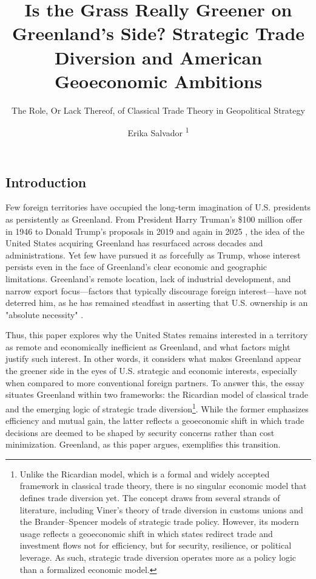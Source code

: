 \documentclass{adonis}
\title{Is the Grass Really Greener on Greenland’s Side? Strategic Trade Diversion and American Geoeconomic Ambitions}
\subtitle{The Role, Or Lack Thereof, of Classical Trade Theory in Geopolitical Strategy}
\author{Erika Salvador \textsuperscript{1}}
\affiliation{\textsuperscript{1} Department of Economics, Amherst College}
\begin{document}
	\maketitle

    \subsection*{Introduction}

    Few foreign territories have occupied the long-term imagination of U.S. presidents as persistently as Greenland. From President Harry Truman’s \$100 million offer in 1946 \citep{ewing2019greenland} to Donald Trump’s proposals in 2019 and again in 2025 \citep{mcdonald2019greenland, paddison2025greenland}, the idea of the United States acquiring Greenland has resurfaced across decades and administrations. Yet few have pursued it as forcefully as Trump, whose interest persists even in the face of Greenland’s clear economic and geographic limitations. Greenland’s remote location, lack of industrial development, and narrow export focus—factors that typically discourage foreign interest—have not deterred him, as he has remained steadfast in asserting that U.S. ownership is an "absolute necessity" \citep{suter2024fox}.

    Thus, this paper explores why the United States remains interested in a territory as remote and economically inefficient as Greenland, and what factors might justify such interest. In other words, it considers what makes Greenland appear the greener side in the eyes of U.S. strategic and economic interests, especially when compared to more conventional foreign partners. To answer this, the essay situates Greenland within two frameworks: the Ricardian model of classical trade and the emerging logic of strategic trade diversion\footnote{Unlike the Ricardian model, which is a formal and widely accepted framework in classical trade theory, there is no singular economic model that defines trade diversion yet. The concept draws from several strands of literature, including Viner’s theory of trade diversion in customs unions and the Brander–Spencer models of strategic trade policy. However, its modern usage reflects a geoeconomic shift in which states redirect trade and investment flows not for efficiency, but for security, resilience, or political leverage. As such, strategic trade diversion operates more as a policy logic than a formalized economic model.}. While the former emphasizes efficiency and mutual gain, the latter reflects a geoeconomic shift in which trade decisions are deemed to be shaped by security concerns rather than cost minimization. Greenland, as this paper argues, exemplifies this transition.
\end{document}
